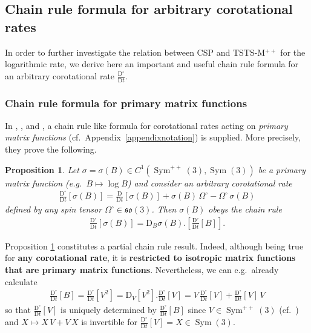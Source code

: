\documentclass[10pt]{article}
\newcounter{theoremCounter}
\numberwithin{theoremCounter}{section}
\theoremstyle{plain}
\newtheorem{prop}[theoremCounter]{Proposition}
\theoremstyle{definition}
\newcommand{\DD}{\mathrm{D}}
\DeclareMathOperator{\Sym}{Sym}
\numberwithin{equation}{section}
\begin{document}
\subsection{Chain rule formula for arbitrary corotational rates} \label{appendchainrule}
%
In order to further investigate the relation between CSP and TSTS-M$^{++}$ for the logarithmic rate, we derive here an important and useful chain rule formula for an arbitrary corotational rate $\frac{\DD^{\circ}}{\DD t}$.
%
\subsubsection{Chain rule formula for primary matrix functions}
%
In \cite[p.~19, Theorem 2]{xiao98_1}, \cite[p.~7]{fiala2020objective}, \cite[p.~1066, Theorem 2.3]{korobeynikov2018} and \cite[p.~10, Lemma 1]{Norris2008}, a chain rule like formula for corotational rates acting on \emph{primary matrix functions} (cf.~Appendix~\ref{appendixnotation})
is supplied. More precisely, they prove the following.
%
\begin{prop} \label{propallgchain01}
Let $\sigma = \sigma(B) \in C^1(\Sym^{++}(3), \Sym(3))$ be a primary matrix function (e.g.~$B \mapsto \log B$) and consider an arbitrary corotational rate
	\begin{align}
	\frac{\DD^{\circ}}{\DD t}[\sigma(B)] = \frac{\DD}{\DD t}[\sigma(B)] + \sigma(B) \, \Omega^{\circ} - \Omega^{\circ} \, \sigma(B)
	\end{align}
defined by any spin tensor $\Omega^{\circ} \in \mathfrak{so}(3)$. Then $\sigma(B)$ obeys the chain rule
	\begin{align}
	\frac{\DD^{\circ}}{\DD t}[\sigma(B)] = \DD_B \sigma(B).\!\left[\frac{\DD^{\circ}}{\DD t}[B]\right].
	\end{align}
\end{prop}
%
\noindent Proposition \ref{propallgchain01} constitutes a partial chain rule result. Indeed, although being true for \textbf{any corotational rate}, it is \textbf{restricted to isotropic matrix functions that are primary matrix functions}. Nevertheless, we can e.g.~already calculate
	\begin{align}
	\frac{\DD^{\circ}}{\DD t}[B] = \frac{\DD^{\circ}}{\DD t}[V^2] = \DD_V[V^2].\frac{\DD^{\circ}}{\DD t}[V] = V \, \frac{\DD^{\circ}}{\DD t}[V] + \frac{\DD^{\circ}}{\DD t}[V] \, V
	\end{align}
so that $\frac{\DD^{\circ}}{\DD t}[V]$ is uniquely determined by $\frac{\DD^{\circ}}{\DD t}[B]$ since $V \in \Sym^{++}(3)$ (cf.~\cite[eq.~3.5b]{Norris2008}) and $X \mapsto X \, V + V \, X$ is invertible for $\frac{\DD^{\circ}}{\DD t}[V] = X \in \Sym(3)$. \\
\end{document}
